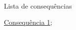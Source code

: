 
\begin{titlemize}{Lista de consequências}
	\item \hyperref[consequencia1]{Consequência 1};\\ %
	\item \hyperref[]{}
\end{titlemize}
